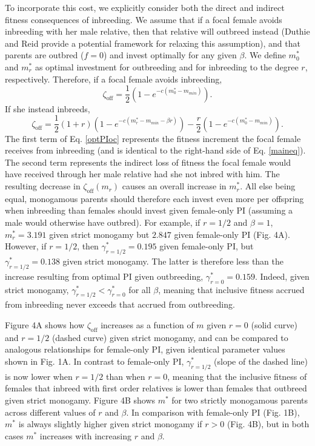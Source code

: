 \documentclass[12pt]{article}
\begin{document}
To incorporate this cost, we explicitly consider both the direct and indirect fitness consequences of inbreeding. We assume that if a focal female avoids inbreeding with her male relative, then that relative will outbreed instead (Duthie and Reid \cite{Duthie2015a} provide a potential framework for relaxing this assumption), and that parents are outbred ($f=0$) and invest optimally for any given $\beta$. We define $m^{*}_{0}$ and $m^{*}_{r}$ as optimal investment for outbreeding and for inbreeding to the degree $r$, respectively. Therefore, if a focal female avoids inbreeding,
\begin{equation} \label{optPI}
\zeta_{\textrm{off}} = \frac{1}{2}\left(1-e^{-c\left(m^{*}_{0}-m_{min}\right)}\right).
\end{equation}
If she instead inbreeds,
\begin{equation} \label{optPIoc}
\zeta_{\textrm{off}} = \frac{1}{2}\left(1+r\right)\left(1-e^{-c\left(m^{*}_{r}-m_{min}-\beta r\right)}\right) - \frac{r}{2}\left(1-e^{-c\left(m^{*}_{0}-m_{min}\right)}\right).
\end{equation} 
The first term of Eq. \ref{optPIoc} represents the fitness increment the focal female receives from inbreeding (and is identical to the right-hand side of Eq. \ref{maineq}). The second term represents the indirect loss of fitness the focal female would have received through her male relative had she not inbred with him. The resulting decrease in $\zeta_{\textrm{off}}(m_{r})$ causes an overall increase in $m^{*}_{r}$. All else being equal, monogamous parents should therefore each invest even more per offspring when inbreeding than females should invest given female-only PI (assuming a male would otherwise have outbred). For example, if $r=1/2$ and $\beta=1$, $m^{*}_{r}= 3.191$ given strict monogamy but $2.847$ given female-only PI (Fig. 4A). However, if $r=1/2$, then $\gamma^{*}_{r=1/2}=0.195$ given female-only PI, but $\gamma^{*}_{r=1/2}=0.138$ given strict monogamy. The latter is therefore less than the increase resulting from optimal PI given outbreeding, $\gamma^{*}_{r=0}=0.159$. Indeed, given strict monogamy, $\gamma^{*}_{r=1/2} < \gamma^{*}_{r=0}$ for all $\beta$, meaning that inclusive fitness accrued from inbreeding never exceeds that accrued from outbreeding. 

Figure 4A shows how $\zeta_{\textrm{off}}$ increases as a function of $m$ given $r=0$ (solid curve) and $r=1/2$ (dashed curve) given strict monogamy, and can be compared to analogous relationships for female-only PI, given identical parameter values shown in Fig. 1A. In contrast to female-only PI, $\gamma^{*}_{r=1/2}$ (slope of the dashed line) is now lower when $r=1/2$ than when $r=0$, meaning that the inclusive fitness of females that inbreed with first order relatives is lower than females that outbreed given strict monogamy. Figure 4B shows $m^{*}$ for two strictly monogamous parents across different values of $r$ and $\beta$. In comparison with female-only PI (Fig. 1B), $m^{*}$ is always slightly higher given strict monogamy if $r>0$ (Fig. 4B), but in both cases $m^{*}$ increases with increasing $r$ and $\beta$. 
\end{document}
